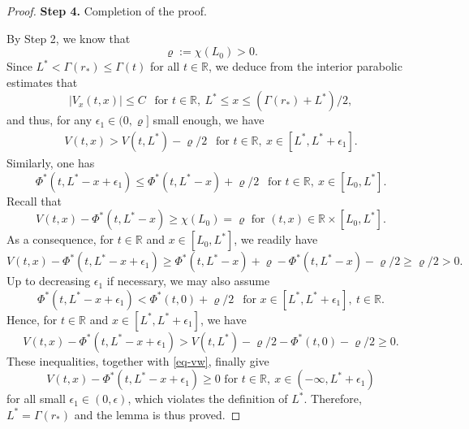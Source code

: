 \documentclass[10pt,a4paper]{amsart}
\begin{document}
\begin{proof}
\textbf{Step 4.} Completion of the proof.

By Step 2, we know that
\begin{equation*}
  \varrho:=\chi(L_0)>0.
\end{equation*}
Since $L^*<\Gamma(r_*)\leq \Gamma(t)$ for all $t\in\mathbb R$, we deduce from the  interior parabolic estimates that 
\begin{equation*}
  |V_x(t,x)|\leq C ~~\text{ for } t\in\mathbb R,~ L^*\leq x\leq (\Gamma(r_*)+L^*)/2,
\end{equation*}
and thus, for any $\epsilon_1\in(0,\varrho ]$ small enough, we have
\begin{eqnarray*}
 V(t,x)>V(t,L^*)-\varrho/2 ~~\text{ for }t\in\mathbb R,\  x\in[L^*,L^*+\epsilon_1].
\end{eqnarray*}
Similarly,  one has
\[\Phi^{*}(t,L^*-x+\epsilon_1)\leq \Phi^*(t,L^*-x)+\varrho/2 ~~\text{ for }t\in\mathbb R,\ x\in[L_0, L^*].\]
Recall that 
\begin{equation*}
V(t,x)-\Phi^*(t,L^*-x)\geq \chi (L_0)=\varrho  \text{ for }(t,x)\in\mathbb{R}\times[L_0,L^*].
\end{equation*}
As a consequence, for $t\in\mathbb{R}$ and $x\in[L_0,L^*]$, we readily have 
\begin{equation*}
  V(t,x)-\Phi^*(t,L^*-x+\epsilon_1)\geq \Phi^*(t,L^*-x)+\varrho - \Phi^*(t,L^*-x)-\varrho/2\geq \varrho/2>0.
\end{equation*}
Up to decreasing $\epsilon_1$ if necessary,  we may also assume
\begin{equation*}
  \Phi^*(t,L^*-x+\epsilon_1)<\Phi^*(t,0)+\varrho/2 ~~\text{ for } x\in[L^*,L^*+\epsilon_1],\ t\in\mathbb R.
\end{equation*}
Hence,  for $t\in\mathbb{R}$ and $x\in[L^*,L^*+\epsilon_1]$, we have
\begin{equation*}
  V(t,x)-\Phi^*(t,L^*-x+\epsilon_1)> V(t,L^*)-\varrho /2 - \Phi^*(t,0)-\varrho/2\geq0.
\end{equation*}
These inequalities, together  with \eqref{eq-vw}, finally give 
\begin{equation*}
  V(t,x)-\Phi^*(t,L^*-x+\epsilon_1)\geq0 \text{ for } t\in\mathbb{R},\ x\in(-\infty,L^*+\epsilon_1)
\end{equation*}
for all small $\epsilon_1\in(0,\epsilon)$, which violates the definition of $L^*$. Therefore, $L^*=\Gamma(r_*)$ and the lemma is thus  proved.
\end{proof}
\end{document}
